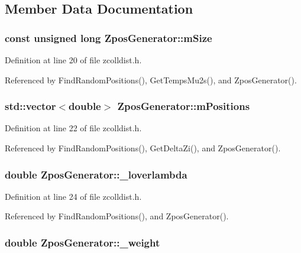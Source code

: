 \subsection{Member Data Documentation}
\subsubsection{\setlength{\rightskip}{0pt plus 5cm}const unsigned long {\bf ZposGenerator::mSize}\hspace{0.3cm}{\tt  [private]}}\label{classZposGenerator_d5447cbf01884d1309e5641863f928fd}




Definition at line 20 of file zcolldist.h.

Referenced by FindRandomPositions(), GetTempsMu2s(), and ZposGenerator().
\subsubsection{\setlength{\rightskip}{0pt plus 5cm}std::vector$<$double$>$ {\bf ZposGenerator::mPositions}\hspace{0.3cm}{\tt  [private]}}\label{classZposGenerator_65b7ea3c519779af67e218dfd4b94e86}




Definition at line 22 of file zcolldist.h.

Referenced by FindRandomPositions(), GetDeltaZi(), and ZposGenerator().
\subsubsection{\setlength{\rightskip}{0pt plus 5cm}double {\bf ZposGenerator::\_\-loverlambda}\hspace{0.3cm}{\tt  [private]}}\label{classZposGenerator_0c44c0025871a793c11a0459f0db343f}




Definition at line 24 of file zcolldist.h.

Referenced by FindRandomPositions(), and ZposGenerator().
\subsubsection{\setlength{\rightskip}{0pt plus 5cm}double {\bf ZposGenerator::\_\-weight}\hspace{0.3cm}{\tt  [private]}}\label{classZposGenerator_13791204df3f02d883a309b880d11043}




